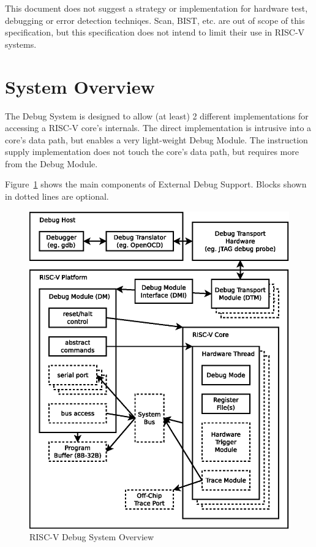 \documentclass{article}
\begin{document}
This document does not suggest a strategy or implementation for hardware test,
debugging or error detection techniqes. Scan, BIST, etc. are out of scope of
this specification, but this specification does not intend to limit their use 
in RISC-V systems.

\section{System Overview} \label{overview}

The Debug System is designed to allow (at least) 2 different implementations
for accessing a RISC-V core's internals.
The direct implementation is intrusive into a core's data path, but enables a
very light-weight Debug Module. The instruction supply implementation does not
touch the core's data path, but requires more from the Debug Module.

Figure~\ref{fig:overview} shows the main components of External Debug Support.
Blocks shown in dotted lines are optional.

\begin{figure}
   \centering
   \includegraphics[width=\textwidth]{overview.eps}
   \caption{RISC-V Debug System Overview}
   \label{fig:overview}
\end{figure}
\end{document}
